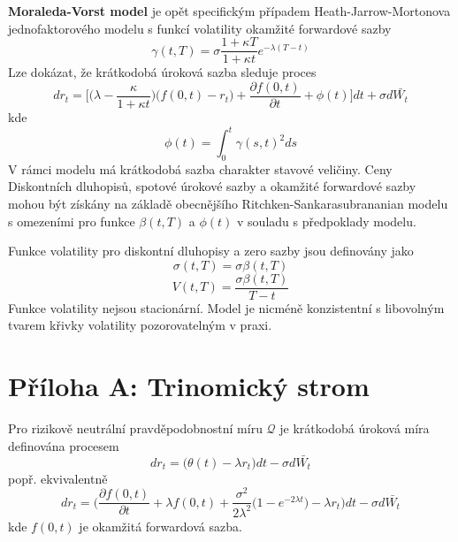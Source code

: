 \documentclass[a4paper]{book}
\begin{document}
\noindent \textbf{Moraleda-Vorst model} je opět specifickým případem Heath-Jarrow-Mortonova jednofaktorového modelu s funkcí volatility okamžité forwardové sazby
\begin{equation*}
\gamma(t,T) = \sigma \frac{1 + \kappa T}{1 + \kappa t} e^{- \lambda (T-t)}
\end{equation*}
Lze dokázat, že krátkodobá úroková sazba sleduje proces
\begin{equation*}
d r_t = \Big[ \Big( \lambda - \frac{\kappa}{1 + \kappa t} \Big)\big( f(0,t) - r_t \big) + \frac{\partial f(0,t)}{\partial t} + \phi(t) \Big]dt + \sigma d \bar{W_t}
\end{equation*}
kde
\begin{equation*}
\phi(t) = \int_0^t \gamma(s,t)^2 ds
\end{equation*}
V rámci modelu má krátkodobá sazba charakter stavové veličiny. Ceny Diskontních dluhopisů, spotové úrokové sazby a okamžité forwardové sazby mohou být získány na základě obecnějšího Ritchken-Sankarasubrananian modelu s omezeními pro funkce $\beta(t,T)$ a $\phi(t)$ v souladu s předpoklady modelu.

Funkce volatility pro diskontní dluhopisy a zero sazby jsou definovány jako
\begin{equation*}
\sigma(t,T) = \sigma \beta(t,T)
\end{equation*}
\begin{equation*}
V(t,T) = \frac{\sigma \beta(t,T)}{T-t}
\end{equation*}
Funkce volatility nejsou stacionární. Model je nicméně konzistentní s libovolným tvarem křivky volatility pozorovatelným v praxi.

\section{Příloha A: Trinomický strom}

Pro rizikově neutrální pravděpodobnostní míru $\mathcal{Q}$ je krátkodobá úroková míra definována procesem
\begin{equation}
d r_t = \big( \theta(t) - \lambda r_t \big) dt - \sigma d \bar{W_t}
\end{equation}
popř. ekvivalentně
\begin{equation}
d r_t = \Big( \frac{\partial f(0,t)}{\partial t} + \lambda f(0,t) + \frac{\sigma^2}{2 \lambda^2}\big( 1 - e^{-2 \lambda t}\big) - \lambda r_t \Big)dt  - \sigma d \bar{W_t}
\end{equation}
kde $f(0,t)$ je okamžitá forwardová sazba.
\end{document}
